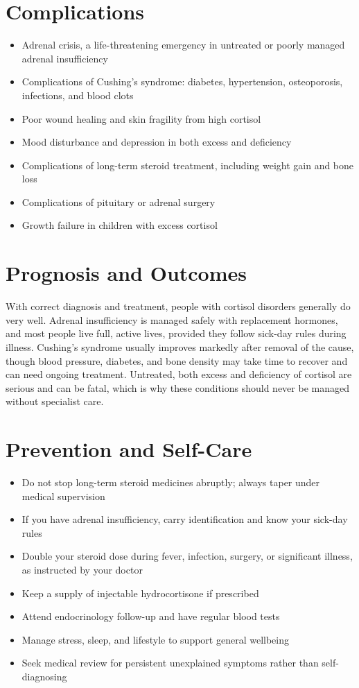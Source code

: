 \section*{Complications}
\begin{itemize}
    \item Adrenal crisis, a life-threatening emergency in untreated or poorly managed adrenal insufficiency
    \item Complications of Cushing's syndrome: diabetes, hypertension, osteoporosis, infections, and blood clots
    \item Poor wound healing and skin fragility from high cortisol
    \item Mood disturbance and depression in both excess and deficiency
    \item Complications of long-term steroid treatment, including weight gain and bone loss
    \item Complications of pituitary or adrenal surgery
    \item Growth failure in children with excess cortisol
\end{itemize}

\section*{Prognosis and Outcomes}
With correct diagnosis and treatment, people with cortisol disorders generally do very well. Adrenal insufficiency is managed safely with replacement hormones, and most people live full, active lives, provided they follow sick-day rules during illness. Cushing's syndrome usually improves markedly after removal of the cause, though blood pressure, diabetes, and bone density may take time to recover and can need ongoing treatment. Untreated, both excess and deficiency of cortisol are serious and can be fatal, which is why these conditions should never be managed without specialist care.

\section*{Prevention and Self-Care}
\begin{itemize}
    \item Do not stop long-term steroid medicines abruptly; always taper under medical supervision
    \item If you have adrenal insufficiency, carry identification and know your sick-day rules
    \item Double your steroid dose during fever, infection, surgery, or significant illness, as instructed by your doctor
    \item Keep a supply of injectable hydrocortisone if prescribed
    \item Attend endocrinology follow-up and have regular blood tests
    \item Manage stress, sleep, and lifestyle to support general wellbeing
    \item Seek medical review for persistent unexplained symptoms rather than self-diagnosing
\end{itemize}

